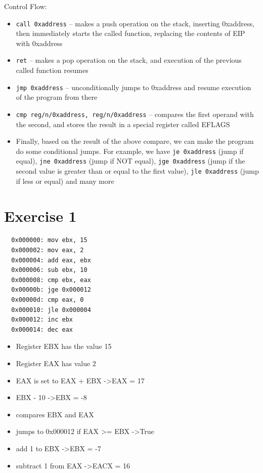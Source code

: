 \documentclass[]{project_plan}
\begin{document}
Control Flow:
\begin{itemize}
  \item \lstinline|call 0xaddress| – makes a push operation on the stack, inserting
        0xaddress, then immediately starts the called function, replacing the
        contents of EIP with 0xaddress
  \item \lstinline|ret| – makes a pop operation on the stack, and execution of the
        previous called function resumes
  \item \lstinline|jmp 0xaddress| – unconditionally jumps to 0xaddress and resume
        execution of the program from there
  \item \lstinline|cmp reg/n/0xaddress, reg/n/0xaddress| – compares the first operand
        with the second, and stores the result in a special register called
        EFLAGS
  \item Finally, based on the result of the above compare, we can make
        the program do some conditional jumps. For example, we have
        \lstinline|je 0xaddress| (jump if equal), \lstinline|jne 0xaddress| (jump if NOT equal),
        \lstinline|jge 0xaddress| (jump if the second value is greater than or equal
        to the first value), \lstinline|jle 0xaddress| (jump if less or equal) and many
        more
\end{itemize}

\section{Exercise 1}
\begin{lstlisting}
  0x000000: mov ebx, 15
  0x000002: mov eax, 2
  0x000004: add eax, ebx
  0x000006: sub ebx, 10
  0x000008: cmp ebx, eax
  0x00000b: jge 0x000012
  0x00000d: cmp eax, 0
  0x000010: jle 0x000004
  0x000012: inc ebx
  0x000014: dec eax
\end{lstlisting}

\begin{itemize}
  \item Register EBX has the value 15
  \item Register EAX has value 2
  \item EAX is set to EAX + EBX -\textgreater EAX = 17
  \item EBX - 10 -\textgreater EBX = -8
  \item compares EBX and EAX
  \item jumps to 0x000012 if EAX \textgreater= EBX -\textgreater True
  \item add 1 to EBX -\textgreater EBX = -7
  \item subtract 1 from EAX -\textgreater EACX = 16
\end{itemize}
\end{document}
